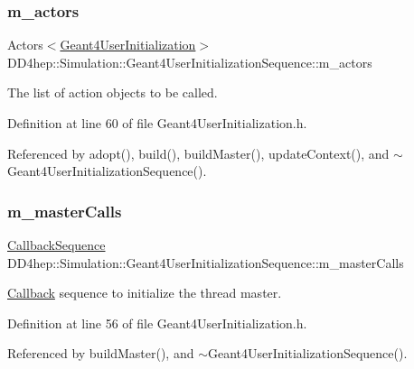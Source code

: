 \subsubsection{\texorpdfstring{m\+\_\+actors}{m\_actors}}
{\footnotesize\ttfamily Actors$<$\hyperlink{class_d_d4hep_1_1_simulation_1_1_geant4_user_initialization}{Geant4\+User\+Initialization}$>$ D\+D4hep\+::\+Simulation\+::\+Geant4\+User\+Initialization\+Sequence\+::m\+\_\+actors\hspace{0.3cm}{\ttfamily [protected]}}



The list of action objects to be called. 



Definition at line 60 of file Geant4\+User\+Initialization.\+h.



Referenced by adopt(), build(), build\+Master(), update\+Context(), and $\sim$\+Geant4\+User\+Initialization\+Sequence().

\hypertarget{class_d_d4hep_1_1_simulation_1_1_geant4_user_initialization_sequence_a3a7aa9cf5219734877b0ab71da54bb29}{}\label{class_d_d4hep_1_1_simulation_1_1_geant4_user_initialization_sequence_a3a7aa9cf5219734877b0ab71da54bb29} 
\subsubsection{\texorpdfstring{m\+\_\+master\+Calls}{m\_masterCalls}}
{\footnotesize\ttfamily \hyperlink{struct_d_d4hep_1_1_callback_sequence}{Callback\+Sequence} D\+D4hep\+::\+Simulation\+::\+Geant4\+User\+Initialization\+Sequence\+::m\+\_\+master\+Calls\hspace{0.3cm}{\ttfamily [protected]}}



\hyperlink{class_d_d4hep_1_1_callback}{Callback} sequence to initialize the thread master. 



Definition at line 56 of file Geant4\+User\+Initialization.\+h.



Referenced by build\+Master(), and $\sim$\+Geant4\+User\+Initialization\+Sequence().


